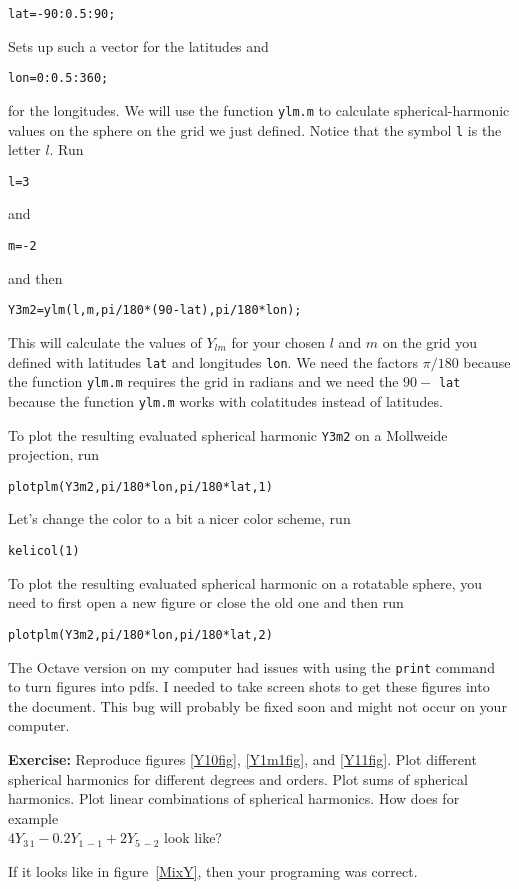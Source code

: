 \documentclass[11pt]{article}
\newcommand{\Yfun}{Y}
\begin{document}
\qquad \verb+lat=-90:0.5:90;+

Sets up such a vector for the latitudes and 

\qquad \verb+lon=0:0.5:360;+

for the longitudes. We will use the function \verb+ylm.m+ to
calculate spherical-harmonic values on the sphere on the grid we just
defined. Notice that the symbol \verb+l+ is the letter $l$. Run

\qquad \verb+l=3+ 

and 

\qquad \verb+m=-2+

and then 

\qquad \verb+Y3m2=ylm(l,m,pi/180*(90-lat),pi/180*lon);+

This will calculate the values of $\Yfun_{lm}$ for your chosen $l$ and
$m$ on the grid you defined with latitudes \verb+lat+ and longitudes
\verb+lon+. We need the factors $\pi/180$ because the function
\verb+ylm.m+ requires the grid in radians and we need the $90-$
\verb+lat+ because the function \verb+ylm.m+ works with colatitudes
instead of latitudes.

To plot the resulting evaluated spherical harmonic \verb+Y3m2+ on a
Mollweide projection, run
  
\qquad \verb+plotplm(Y3m2,pi/180*lon,pi/180*lat,1)+

Let's change the color to a bit a nicer color scheme, run

\quad \verb+kelicol(1)+


To plot the resulting evaluated spherical harmonic on a rotatable
sphere, you need to first open a new figure or close the old one and
then run

\qquad \verb+plotplm(Y3m2,pi/180*lon,pi/180*lat,2)+

The Octave version on my computer had issues with using the
\verb+print+ command to turn figures into pdfs. I needed to take
screen shots to get these figures into the document. This bug will
probably be fixed soon and might not occur on your computer.

\textbf{Exercise:} Reproduce figures \ref{Y10fig}, \ref{Y1m1fig}, and \ref{Y11fig}. Plot different spherical harmonics for different degrees and orders. Plot sums of spherical harmonics. Plot linear combinations of spherical harmonics. How does for example \\{$4\Yfun_{3\,1} - 0.2\Yfun_{1\,-1} +2\Yfun_{5\,-2}$} look like?

If it looks like in figure~\ref{MixY}, then your programing was
correct.
\end{document}
